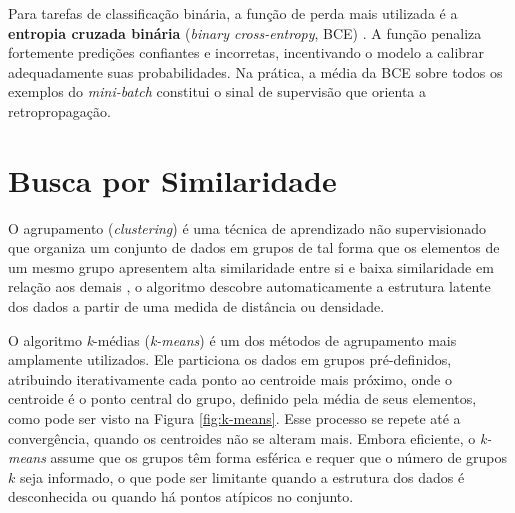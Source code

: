 Para tarefas de classificação binária, a função de perda mais utilizada é a \textbf{entropia cruzada binária} (\textit{binary cross-entropy}, BCE) \cite{goodfellow2016}. A função penaliza fortemente predições confiantes e incorretas, incentivando o modelo a calibrar adequadamente suas probabilidades. Na prática, a média da BCE sobre todos os exemplos do \textit{mini-batch} constitui o sinal de supervisão que orienta a retropropagação.


\section{Busca por Similaridade}

O agrupamento (\textit{clustering}) é uma técnica de aprendizado não supervisionado que organiza um conjunto de dados em grupos de tal forma que os elementos de um mesmo grupo apresentem alta similaridade entre si e baixa similaridade em relação aos demais \cite{jain1999}, o algoritmo descobre automaticamente a estrutura latente dos dados a partir de uma medida de distância ou densidade.

O algoritmo \textit{k}-médias (\textit{k-means}) \cite{macqueen1967} é um dos métodos de agrupamento mais amplamente utilizados. Ele particiona os dados em grupos pré-definidos, atribuindo iterativamente cada ponto ao centroide mais próximo, onde o centroide é o ponto central do grupo, definido pela média de seus elementos, como pode ser visto na Figura \ref{fig:k-means}. Esse processo se repete até a convergência, quando os centroides não se alteram mais. Embora eficiente, o \textit{k-means} assume que os grupos têm forma esférica e requer que o número de grupos $k$ seja informado, o que pode ser limitante quando a estrutura dos dados é desconhecida ou quando há pontos atípicos no conjunto.

